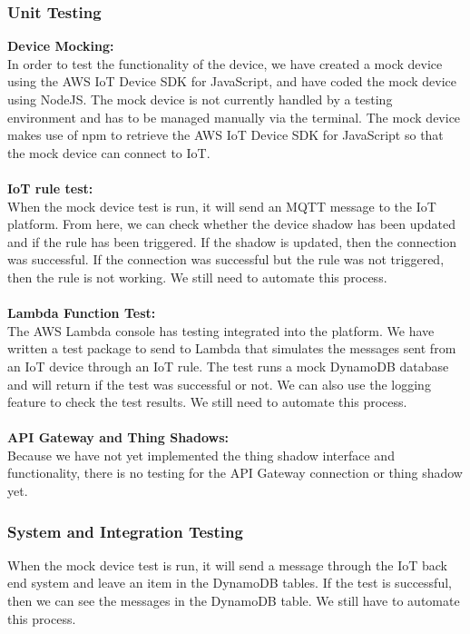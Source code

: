 \documentclass{article}
\begin{document}
		\subsubsection{Unit Testing}
			\textbf{Device Mocking:}
			\\
			In order to test the functionality of the device, we have created a mock device using the AWS IoT Device SDK for
			JavaScript, and have coded the mock device using NodeJS. The mock device is not currently handled by a
			testing environment and has to be managed manually via the terminal. The mock device makes use of npm to retrieve
			the AWS IoT Device SDK for JavaScript so that the mock device can connect to IoT.
			\\\\
			\textbf{IoT rule test:}
			\\
			When the mock device test is run, it will send an MQTT message to the IoT platform. From here, we can check whether
			the device shadow has been updated and if the rule has been triggered. If the shadow is updated, then the connection
			was successful. If the connection was successful but the rule was not triggered, then the rule is not working. We
			still need to automate this process.
			\\\\
			\textbf{Lambda Function Test:}
			\\
			The AWS Lambda console has testing integrated into the platform. We have written a test package to send to Lambda
			that simulates the messages sent from an IoT device through an IoT rule. The test runs a mock DynamoDB database
			and will return if the test was successful or not. We can also use the logging feature to check the test results.
			We still need to automate this process.
			\\\\
			\textbf{API Gateway and Thing Shadows:}
			\\
			Because we have not yet implemented the thing shadow interface and functionality, there is no testing for the API
			Gateway connection or thing shadow yet.
			
			\subsubsection{System and Integration Testing}
			When the mock device test is run, it will send a message through the IoT back end system and leave an item in the 
			DynamoDB tables. If the test is successful, then we can see the messages in the DynamoDB table. We still have to 
			automate this process.
			
\end{document}
